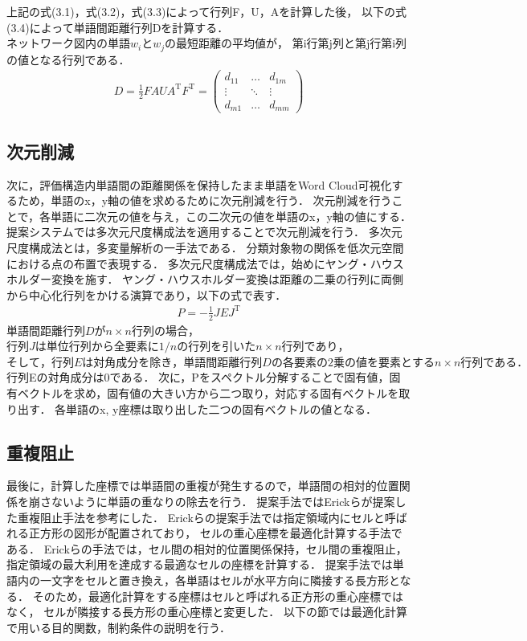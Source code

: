 \documentclass[syuuron]{kuee}
\begin{document}
			上記の式(3.1)，式(3.2)，式(3.3)によって行列F，U，Aを計算した後，
			以下の式(3.4)によって単語間距離行列Dを計算する．
			$ネットワーク図内の単語w_iとw_jの最短距離の平均値が，$
			第i行第j列と第j行第i列の値となる行列である．
			\begin{eqnarray}
			 D = \frac{1}{2} FAUA^{\mathrm{T}}F^{\mathrm{T}}
			   = \left(
			    \begin{array}{cccc}
			    	d_{11} & \ldots & d_{1m} \\
			    	\vdots & \ddots & \vdots \\
			    	d_{m1} & \ldots & d_{mm}
				\end{array}
			 \right)
			\end{eqnarray}	
			
		\subsection{次元削減}
			次に，評価構造内単語間の距離関係を保持したまま単語をWord Cloud可視化するため，単語のx，y軸の値を求めるために次元削減を行う．
			次元削減を行うことで，各単語に二次元の値を与え，この二次元の値を単語のx，y軸の値にする．
			提案システムでは多次元尺度構成法を適用することで次元削減を行う．
			多次元尺度構成法とは，多変量解析の一手法である． 分類対象物の関係を低次元空間における点の布置で表現する．
			多次元尺度構成法では，始めにヤング・ハウスホルダー変換を施す．
			ヤング・ハウスホルダー変換は距離の二乗の行列に両側から中心化行列をかける演算であり，以下の式で表す．
			\begin{eqnarray}
				P = - \frac{1}{2} JEJ^{\mathrm{T}}
			\end{eqnarray}
			$単語間距離行列Dがn \times n行列の場合，$
			$行列Jは単位行列から全要素に1/nの行列を引いたn \times n行列であり，$
			$そして，行列Eは対角成分を除き，単語間距離行列Dの各要素の2乗の値を要素とするn \times n行列である．$
			行列Eの対角成分は0である．
			次に，Pをスペクトル分解することで固有値，固有ベクトルを求め，固有値の大きい方から二つ取り，対応する固有ベクトルを取り出す．
			各単語のx, y座標は取り出した二つの固有ベクトルの値となる．
			
		\subsection{重複阻止}
			最後に，計算した座標では単語間の重複が発生するので，単語間の相対的位置関係を崩さないように単語の重なりの除去を行う．
			提案手法ではErickらが提案した重複阻止手法を参考にした\cite{or2}．
			Erickらの提案手法では指定領域内にセルと呼ばれる正方形の図形が配置されており，
			セルの重心座標を最適化計算する手法である．
			Erickらの手法では，セル間の相対的位置関係保持，セル間の重複阻止，指定領域の最大利用を達成する最適なセルの座標を計算する．
			提案手法では単語内の一文字をセルと置き換え，各単語はセルが水平方向に隣接する長方形となる．
			そのため，最適化計算をする座標はセルと呼ばれる正方形の重心座標ではなく，
			セルが隣接する長方形の重心座標と変更した．
			以下の節では最適化計算で用いる目的関数，制約条件の説明を行う．
			
\end{document}
